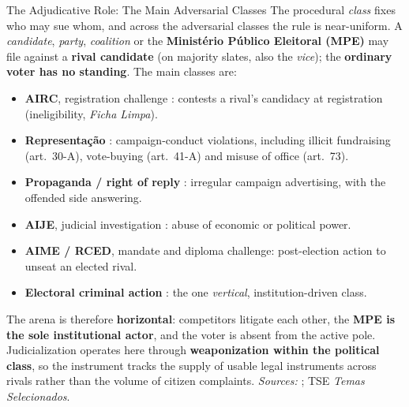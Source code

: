 

\begin{frame}{The Adjudicative Role: The Main Adversarial Classes}
\hypertarget{src:adjudication}{}
\footnotesize
The procedural \emph{class} fixes who may sue whom, and across the adversarial classes the rule is near-uniform. A \emph{candidate}, \emph{party}, \emph{coalition} or the \textbf{Minist\'erio P\'ublico Eleitoral (MPE)} may file against a \textbf{rival candidate} (on majority slates, also the \emph{vice}); the \textbf{ordinary voter has no standing}. The main classes are:
\smallskip
\begin{itemize}\itemsep3pt
  \item \textbf{AIRC}, registration challenge : contests a rival's candidacy at registration (ineligibility, \emph{Ficha Limpa}).
  \item \textbf{Representa\c{c}\~ao} : campaign-conduct violations, including illicit fundraising (art.~30-A), vote-buying (art.~41-A) and misuse of office (art.~73).
  \item \textbf{Propaganda / right of reply} : irregular campaign advertising, with the offended side answering.
  \item \textbf{AIJE}, judicial investigation : abuse of economic or political power.
  \item \textbf{AIME / RCED}, mandate and diploma challenge: post-election action to unseat an elected rival.
  \item \textcolor{mygray}{\textbf{Electoral criminal action} : the one \emph{vertical}, institution-driven class.}
\end{itemize}
\smallskip
\scriptsize The arena is therefore \textbf{horizontal}: competitors litigate each other, the \textbf{MPE is the sole institutional actor}, and the voter is absent from the active pole. Judicialization operates here through \textbf{weaponization within the political class}, so the instrument tracks the supply of usable legal instruments across rivals rather than the volume of citizen complaints. \emph{Sources:} \citet{gomes2024}; TSE \emph{Temas Selecionados}.
\end{frame}
